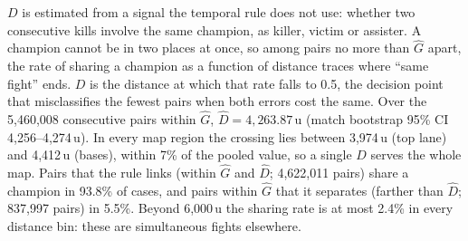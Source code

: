 $D$ is estimated from a signal the temporal rule does not use: whether two consecutive kills involve
the same champion, as killer, victim or assister. A champion cannot be in two places at once, so among
pairs no more than $\hat G$ apart, the rate of sharing a champion as a function of distance traces where
``same fight'' ends. $D$ is the distance at which that rate falls to 0.5, the decision point that
misclassifies the fewest pairs when both errors cost the same. Over the 5,460,008 consecutive pairs
within $\hat G$, $\hat D = 4{,}263.87$\,u (match bootstrap 95\% CI 4,256--4,274\,u). In every map region
the crossing lies between 3,974\,u (top lane) and 4,412\,u (bases), within 7\% of the pooled value, so a
single $D$ serves the whole map.
Pairs that the rule links (within $\hat G$ and $\hat D$; 4,622,011 pairs) share a champion in 93.8\%
of cases, and pairs within $\hat G$ that it separates (farther than $\hat D$; 837,997 pairs) in 5.5\%.
Beyond 6,000\,u the sharing rate is at most 2.4\% in every distance bin: these are simultaneous fights
elsewhere.

